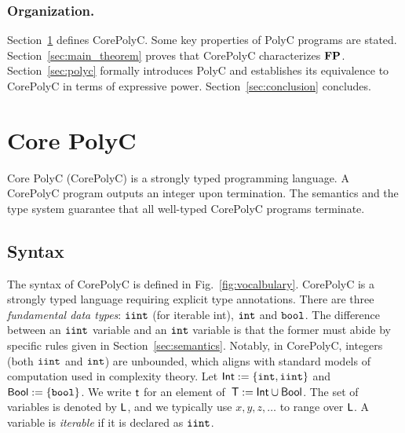 \documentclass[runningheads]{llncs}
\begin{document}
\subsubsection{Organization.}
Section~\ref{sec:CorePolyC} defines CorePolyC.
Some key properties of PolyC programs are stated.
Section~\ref{sec:main_theorem} proves that CorePolyC characterizes $\classFP$.
Section~\ref{sec:polyc} formally introduces PolyC and establishes its equivalence to CorePolyC in terms of expressive power. 
Section~\ref{sec:conclusion} concludes.
\section{Core PolyC}
\label{sec:CorePolyC}

Core PolyC (CorePolyC) is a strongly typed programming language.
A CorePolyC program outputs an integer upon termination.
The semantics and the type system guarantee that all well-typed CorePolyC programs terminate.

\subsection{Syntax}
\label{subsec:syntax}

The syntax of CorePolyC is defined in Fig.~\ref{fig:vocalbulary}.
CorePolyC is a strongly typed language requiring explicit type annotations.
There are three \textit{fundamental data types}: $\typeIterInt$ (for iterable int), $\typeInt$ and $\typeBool$.
The difference between an $\typeIterInt$ variable and an $\typeInt$ variable is that the former must abide by specific rules given in Section~\ref{sec:semantics}.
Notably, in CorePolyC, integers (both $\typeIterInt$ and $\typeInt$) are unbounded, which aligns with standard models of computation used in complexity theory. 
Let $\Int:=\{\typeInt,\typeIterInt\}$ and $\Bool:=\{\typeBool\}$.
We write $\tt$ for an element of $\,\T := \Int\cup\Bool$.
The set of variables is denoted by $\L$, and we typically use $x, y, z, \ldots$ to range over $\L$.
A variable is \textit{iterable} if it is declared as $\typeIterInt$.
\end{document}
